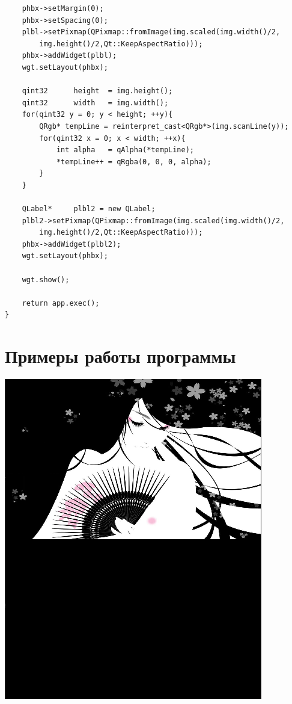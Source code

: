 \documentclass[russian,a4paper,12pt]{scrartcl}
\begin{document}
\begin{flushleft}
\begin{verbatim}
    phbx->setMargin(0);
    phbx->setSpacing(0);
    plbl->setPixmap(QPixmap::fromImage(img.scaled(img.width()/2,
    	img.height()/2,Qt::KeepAspectRatio)));
    phbx->addWidget(plbl);
    wgt.setLayout(phbx);

    qint32      height  = img.height();
    qint32      width   = img.width();
    for(qint32 y = 0; y < height; ++y){
        QRgb* tempLine = reinterpret_cast<QRgb*>(img.scanLine(y));
        for(qint32 x = 0; x < width; ++x){
            int alpha   = qAlpha(*tempLine);
            *tempLine++ = qRgba(0, 0, 0, alpha);
        }
    }

    QLabel*     plbl2 = new QLabel;
    plbl2->setPixmap(QPixmap::fromImage(img.scaled(img.width()/2,
    	img.height()/2,Qt::KeepAspectRatio)));
    phbx->addWidget(plbl2);
    wgt.setLayout(phbx);

    wgt.show();

    return app.exec();
}

			\end{verbatim}
		\section{Примеры работы программы}
			\includegraphics[scale=0.5]{Screenshot1}

\end{flushleft}
\end{document}
